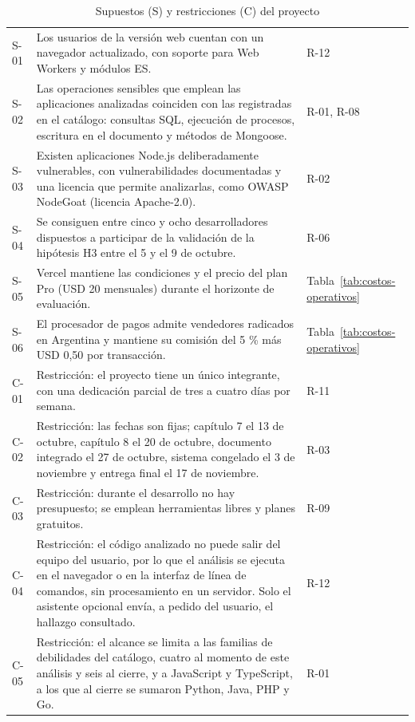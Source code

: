 \begin{table}[H]
    \centering
    \caption{Supuestos (S) y restricciones (C) del proyecto}
    \label{tab:supuestos-restricciones}
    \small
    \begin{tabularx}{\textwidth}{l L l}
        \toprule
         &  &  \\
        \midrule
        S-01 & Los usuarios de la versión web cuentan con un navegador actualizado, con soporte para Web Workers y módulos ES. & R-12 \\
        S-02 & Las operaciones sensibles que emplean las aplicaciones analizadas coinciden con las registradas en el catálogo: consultas SQL, ejecución de procesos, escritura en el documento y métodos de Mongoose. & R-01, R-08 \\
        S-03 & Existen aplicaciones Node.js deliberadamente vulnerables, con vulnerabilidades documentadas y una licencia que permite analizarlas, como OWASP NodeGoat (licencia Apache-2.0). & R-02 \\
        S-04 & Se consiguen entre cinco y ocho desarrolladores dispuestos a participar de la validación de la hipótesis H3 entre el 5 y el 9 de octubre. & R-06 \\
        S-05 & Vercel mantiene las condiciones y el precio del plan Pro (USD 20 mensuales) durante el horizonte de evaluación. & Tabla~\ref{tab:costos-operativos} \\
        S-06 & El procesador de pagos admite vendedores radicados en Argentina y mantiene su comisión del 5 \% más USD 0,50 por transacción. & Tabla~\ref{tab:costos-operativos} \\
        C-01 & Restricción: el proyecto tiene un único integrante, con una dedicación parcial de tres a cuatro días por semana. & R-11 \\
        C-02 & Restricción: las fechas son fijas; capítulo 7 el 13 de octubre, capítulo 8 el 20 de octubre, documento integrado el 27 de octubre, sistema congelado el 3 de noviembre y entrega final el 17 de noviembre. & R-03 \\
        C-03 & Restricción: durante el desarrollo no hay presupuesto; se emplean herramientas libres y planes gratuitos. & R-09 \\
        C-04 & Restricción: el código analizado no puede salir del equipo del usuario, por lo que el análisis se ejecuta en el navegador o en la interfaz de línea de comandos, sin procesamiento en un servidor. Solo el asistente opcional envía, a pedido del usuario, el hallazgo consultado. & R-12 \\
        C-05 & Restricción: el alcance se limita a las familias de debilidades del catálogo, cuatro al momento de este análisis y seis al cierre, y a JavaScript y TypeScript, a los que al cierre se sumaron Python, Java, PHP y Go. & R-01 \\
        \bottomrule
    \end{tabularx}
\end{table}

